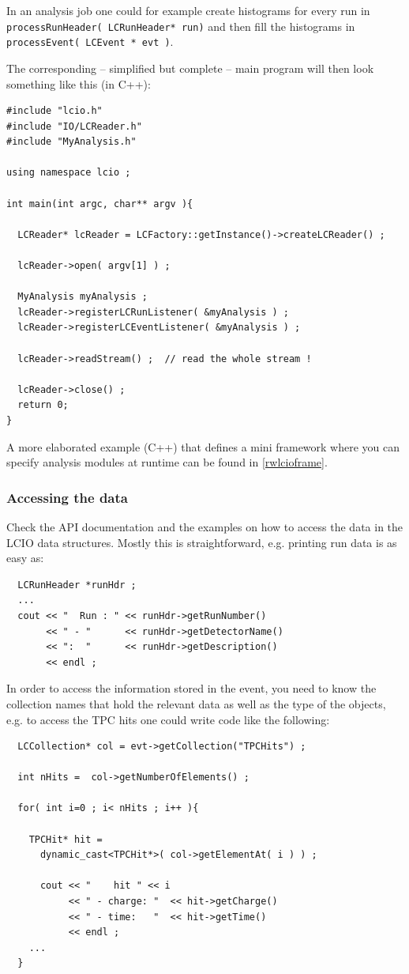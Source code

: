 \documentclass[twoside]{article}
\begin{document}
In an analysis job one could for example create histograms for every run in \\
\verb$processRunHeader( LCRunHeader* run)$
and then fill the histograms in \verb$processEvent( LCEvent * evt )$.

The corresponding -- simplified but complete -- main program will then look something 
like this (in C++):

\begin{verbatim}
#include "lcio.h"
#include "IO/LCReader.h"
#include "MyAnalysis.h"

using namespace lcio ;

int main(int argc, char** argv ){

  LCReader* lcReader = LCFactory::getInstance()->createLCReader() ;
  
  lcReader->open( argv[1] ) ;

  MyAnalysis myAnalysis ;
  lcReader->registerLCRunListener( &myAnalysis ) ;
  lcReader->registerLCEventListener( &myAnalysis ) ;

  lcReader->readStream() ;  // read the whole stream !

  lcReader->close() ;
  return 0;
}
\end{verbatim}

A more elaborated example (C++) that defines a mini framework where you can specify analysis modules at 
runtime can be found in \ref{rwlcioframe}.

\subsubsection{Accessing the data}
Check the API documentation and the examples on how to access the data in the LCIO data structures.
Mostly this is straightforward, e.g. printing run data is as easy as:

\begin{verbatim}
  LCRunHeader *runHdr ;
  ...  
  cout << "  Run : " << runHdr->getRunNumber() 
       << " - "      << runHdr->getDetectorName() 
       << ":  "      << runHdr->getDescription()  
       << endl ;
\end{verbatim}

In order to access the information stored in the event, you need to know the collection names that 
hold the relevant data as well as the type of the objects, e.g. to access the TPC hits one could 
write code like the following:

\begin{verbatim}
  LCCollection* col = evt->getCollection("TPCHits") ;

  int nHits =  col->getNumberOfElements() ;

  for( int i=0 ; i< nHits ; i++ ){

    TPCHit* hit = 
      dynamic_cast<TPCHit*>( col->getElementAt( i ) ) ;

      cout << "    hit " << i 
           << " - charge: "  << hit->getCharge() 
           << " - time:   "  << hit->getTime()
           << endl ; 
    ...
  }
\end{verbatim}
\end{document}
